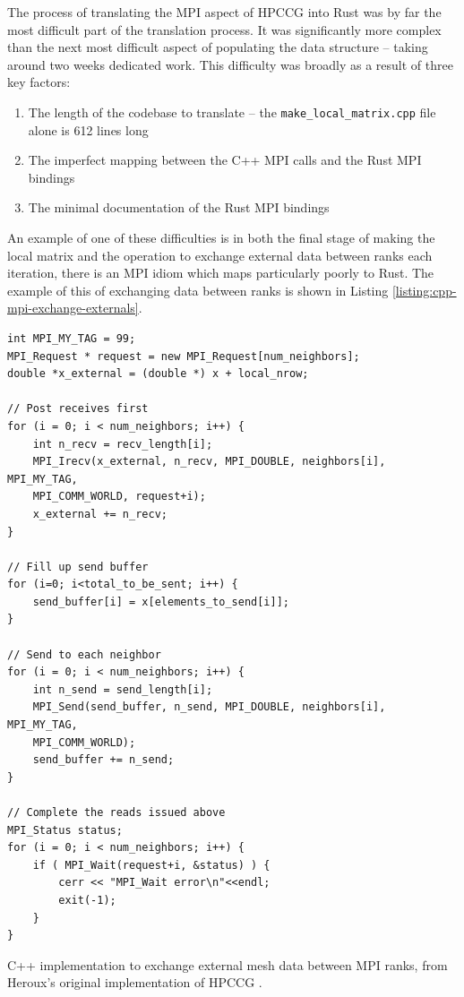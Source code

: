 The process of translating the MPI aspect of HPCCG into Rust was by far the most difficult part of the translation process. It was significantly more complex than the next most difficult aspect of populating the data structure -- taking around two weeks dedicated work. This difficulty was broadly as a result of three key factors:

\begin{enumerate}
    \item The length of the codebase to translate -- the \texttt{make\_local\_matrix.cpp} file alone is 612 lines long
    \item The imperfect mapping between the C++ MPI calls and the Rust MPI bindings
    \item The minimal documentation of the Rust MPI bindings
\end{enumerate}

An example of one of these difficulties is in both the final stage of making the local matrix and the operation to exchange external data between ranks each iteration, there is an MPI idiom which maps particularly poorly to Rust.
The example of this of exchanging data between ranks is shown in Listing \ref{listing:cpp-mpi-exchange-externals}.

\begin{code}
    \begin{verbatim}
int MPI_MY_TAG = 99;  
MPI_Request * request = new MPI_Request[num_neighbors];
double *x_external = (double *) x + local_nrow;

// Post receives first 
for (i = 0; i < num_neighbors; i++) {
    int n_recv = recv_length[i];
    MPI_Irecv(x_external, n_recv, MPI_DOUBLE, neighbors[i], MPI_MY_TAG, 
    MPI_COMM_WORLD, request+i);
    x_external += n_recv;
}

// Fill up send buffer
for (i=0; i<total_to_be_sent; i++) {
    send_buffer[i] = x[elements_to_send[i]];
}

// Send to each neighbor
for (i = 0; i < num_neighbors; i++) {
    int n_send = send_length[i];
    MPI_Send(send_buffer, n_send, MPI_DOUBLE, neighbors[i], MPI_MY_TAG, 
    MPI_COMM_WORLD);
    send_buffer += n_send;
}

// Complete the reads issued above
MPI_Status status;
for (i = 0; i < num_neighbors; i++) {
    if ( MPI_Wait(request+i, &status) ) {
        cerr << "MPI_Wait error\n"<<endl;
        exit(-1);
    }
}
    \end{verbatim}
    \caption{C++ implementation to exchange external mesh data between MPI ranks, from Heroux's original implementation of HPCCG \cite{MantevoHPCCG2023}.}
    \label{listing:cpp-mpi-exchange-externals}
\end{code}

